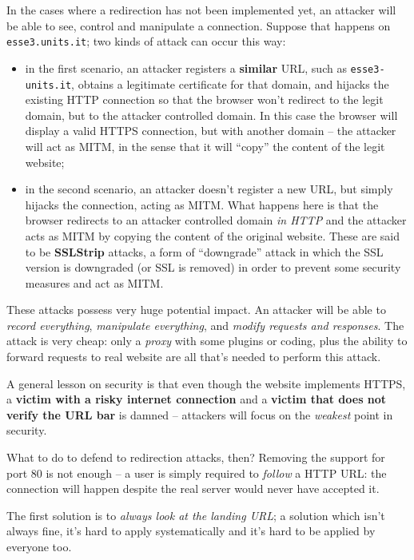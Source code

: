 \documentclass[10pt]{extbook}
\begin{document}
In the cases where a redirection has not been implemented yet, an attacker will
be able to see, control and manipulate a connection. Suppose that happens on
\texttt{esse3.\-units.it}; two kinds of attack can occur this way:
\begin{itemize}
    \item in the first scenario, an attacker registers a \textbf{similar} URL,
        such as \texttt{esse3\--units.it}, obtains a legitimate certificate for
        that domain, and hijacks the existing HTTP connection so that the
        browser won't redirect to the legit domain, but to the attacker
        controlled domain. In this case the browser will display a valid HTTPS
        connection, but with another domain -- the attacker will act as MITM,
        in the sense that it will ``copy'' the content of the legit website;
    \item in the second scenario, an attacker doesn't register a new URL, but
        simply hijacks the connection, acting as MITM. What happens here is
        that the browser redirects to an attacker controlled domain \emph{in
        HTTP} and the attacker acts as MITM by copying the content of the
        original website. These are said to be \textbf{SSLStrip} attacks, a form
        of ``downgrade'' attack in which the SSL version is downgraded (or SSL
        is removed) in order to prevent some security measures and act as MITM.
\end{itemize}

These attacks possess very huge potential impact. An attacker will be able to
\emph{record everything}, \emph{manipulate everything}, and \emph{modify
requests and responses}. The attack is very cheap: only a \emph{proxy} with
some plugins or coding, plus the ability to forward requests to real website
are all that's needed to perform this attack.

A general lesson on security is that even though the website implements HTTPS,
a \textbf{victim with a risky internet connection} and a \textbf{victim that
does not verify the URL bar} is damned -- attackers will focus on the
\emph{weakest} point in security.

What to do to defend to redirection attacks, then?
Removing the support for port $80$ is not enough -- a user is simply required
to \emph{follow} a HTTP URL: the connection will happen despite the real server
would never have accepted it. 

The first solution is to \emph{always look at the landing URL}; a solution
which isn't always fine, it's hard to apply systematically and it's hard to be
applied by everyone too.
\end{document}
